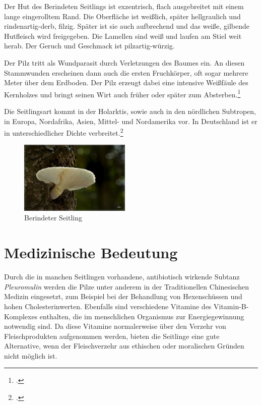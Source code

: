 \documentclass[a4paper,abstracton]{scrreprt}
\begin{document}
Der Hut des Berindeten Seitlings ist exzentrisch, flach ausgebreitet mit einem lange eingerolltem Rand. Die Oberfläche ist weißlich, später hellgraulich und rindenartig-derb, filzig. Später ist sie auch aufbrechend und das weiße, gilbende Hutfleisch wird freigegeben. Die Lamellen sind weiß und laufen am Stiel weit herab. Der Geruch und Geschmack ist pilzartig-würzig.

Der Pilz tritt als Wundparasit durch Verletzungen des Baumes ein. An diesen Stammwunden erscheinen dann auch die ersten Fruchkörper, oft sogar mehrere Meter über dem Erdboden. Der Pilz erzeugt dabei eine intensive Weißfäule des Kernholzes und bringt seinen Wirt auch früher oder später zum Absterben.\footcite{tintling_berindet}

Die Seitlingsart kommt in der Holarktis, sowie auch in den nördlichen Subtropen, in Europa, Nordafrika, Asien, Mittel- und Nordamerika vor. In Deutschland ist er in unterschiedlicher Dichte verbreitet.\footcite{faktenuber_berindet}

\begin{figure}[H]
\centering
\includegraphics[width=200px]{berindeter_seitling}
\caption{Berindeter Seitling\protect\footnotemark}
\label{fig:berindeter_seitling}
\end{figure}

\section{Medizinische Bedeutung}
Durch die in manchen Seitlingen vorhandene, antibiotisch wirkende Subtanz \emph{Pleuromulin} werden die Pilze unter anderem in der Traditionellen Chinesischen Medizin eingesetzt, zum Beispiel bei der Behandlung von Hexenschüssen und hohen Cholesterinwerten. Ebenfalls sind verschiedene Vitamine des Vitamin-B-Komplexes enthalten, die im menschlichen Organismus zur Energiegewinnung notwendig sind. Da diese Vitamine normalerweise über den Verzehr von Fleischprodukten aufgenommen werden, bieten die Seitlinge eine gute Alternative, wenn der Fleischverzehr aus ethischen oder moralischen Gründen nicht möglich ist. 
\end{document}
